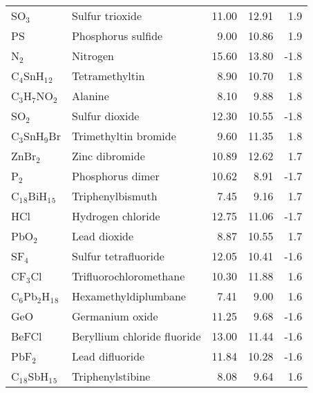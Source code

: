 \begin{table}
\begin{center}
\begin{tabular}{llrrr}
 SO$_3$               & Sulfur trioxide                        &   11.00   &    12.91   &    1.9\\
 PS                   & Phosphorus sulfide                     &    9.00   &    10.86   &    1.9\\
 N$_2$                & Nitrogen                               &   15.60   &    13.80   &   -1.8\\
 C$_4$SnH$_1$$_2$     & Tetramethyltin                         &    8.90   &    10.70   &    1.8\\
 C$_3$H$_7$NO$_2$     & Alanine                                &    8.10   &     9.88   &    1.8\\
 SO$_2$               & Sulfur dioxide                         &   12.30   &    10.55   &   -1.8\\
 C$_3$SnH$_9$Br       & Trimethyltin bromide                   &    9.60   &    11.35   &    1.8\\
 ZnBr$_2$             & Zinc dibromide                         &   10.89   &    12.62   &    1.7\\
 P$_2$                & Phosphorus dimer                       &   10.62   &     8.91   &   -1.7\\
 C$_1$$_8$BiH$_1$$_5$ & Triphenylbismuth                       &    7.45   &     9.16   &    1.7\\
 HCl                  & Hydrogen chloride                      &   12.75   &    11.06   &   -1.7\\
 PbO$_2$              & Lead dioxide                           &    8.87   &    10.55   &    1.7\\
 SF$_4$               & Sulfur tetrafluoride                   &   12.05   &    10.41   &   -1.6\\
 CF$_3$Cl             & Trifluorochloromethane                 &   10.30   &    11.88   &    1.6\\
 C$_6$Pb$_2$H$_1$$_8$ & Hexamethyldiplumbane                   &    7.41   &     9.00   &    1.6\\
 GeO                  & Germanium oxide                        &   11.25   &     9.68   &   -1.6\\
 BeFCl                & Beryllium chloride fluoride            &   13.00   &    11.44   &   -1.6\\
 PbF$_2$              & Lead difluoride                        &   11.84   &    10.28   &   -1.6\\
 C$_1$$_8$SbH$_1$$_5$ & Triphenylstibine                       &    8.08   &     9.64   &    1.6\\

\end{tabular}
\end{center}
\end{table}
